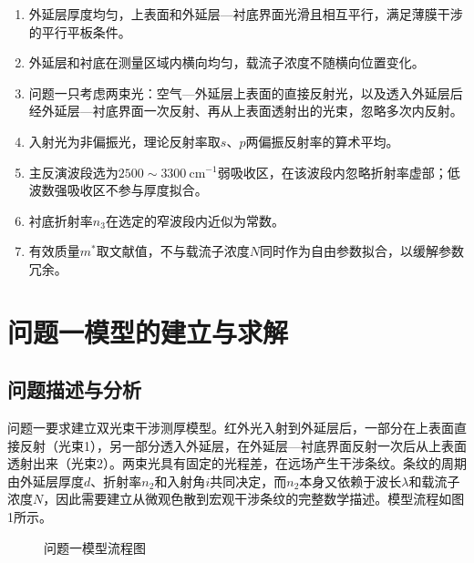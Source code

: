 \documentclass[12pt,a4paper]{ctexart}
\begin{document}
	\begin{enumerate}[leftmargin=2em,itemsep=0.3ex]
		\item 外延层厚度均匀，上表面和外延层—衬底界面光滑且相互平行，满足薄膜干涉的平行平板条件。
		\item 外延层和衬底在测量区域内横向均匀，载流子浓度不随横向位置变化。
		\item 问题一只考虑两束光：空气—外延层上表面的直接反射光，以及透入外延层后经外延层—衬底界面一次反射、再从上表面透射出的光束，忽略多次内反射。
		\item 入射光为非偏振光，理论反射率取$s$、$p$两偏振反射率的算术平均。
		\item 主反演波段选为$2500\sim3300\ \mathrm{cm^{-1}}$弱吸收区，在该波段内忽略折射率虚部；低波数强吸收区不参与厚度拟合。
		\item 衬底折射率$n_3$在选定的窄波段内近似为常数。
		\item 有效质量$m^*$取文献值，不与载流子浓度$N$同时作为自由参数拟合，以缓解参数冗余。
	\end{enumerate}
	
	\section{问题一模型的建立与求解}
	
	\subsection{问题描述与分析}
	问题一要求建立双光束干涉测厚模型。红外光入射到外延层后，一部分在上表面直接反射（光束1），另一部分透入外延层，在外延层—衬底界面反射一次后从上表面透射出来（光束2）。两束光具有固定的光程差，在远场产生干涉条纹。条纹的周期由外延层厚度$d$、折射率$n_2$和入射角$i$共同决定，而$n_2$本身又依赖于波长$\lambda$和载流子浓度$N$，因此需要建立从微观色散到宏观干涉条纹的完整数学描述。模型流程如图1所示。
	
	\begin{figure}[htbp]
		\centering
		\caption{问题一模型流程图}
		\label{fig:q1_flow}
	\end{figure}
	
\end{document}
